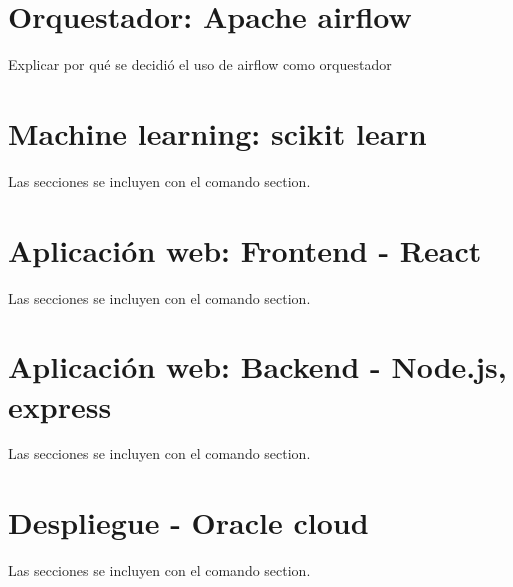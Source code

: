 \section{Orquestador: Apache airflow}

Explicar por qué se decidió el uso de airflow como orquestador

\section{Machine learning: scikit learn}

Las secciones se incluyen con el comando section.

\section{Aplicación web: Frontend - React}

Las secciones se incluyen con el comando section.

\section{Aplicación web: Backend - Node.js, express}

Las secciones se incluyen con el comando section.

\section{Despliegue - Oracle cloud}

Las secciones se incluyen con el comando section.

